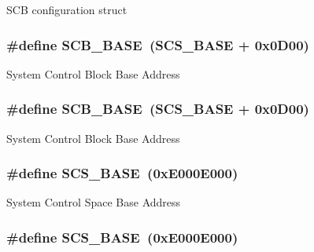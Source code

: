 S\-C\-B configuration struct \hypertarget{group___c_m_s_i_s___c_m3__core__register_gad55a7ddb8d4b2398b0c1cfec76c0d9fd}{
\subsubsection[{S\-C\-B\-\_\-\-B\-A\-S\-E}]{\setlength{\rightskip}{0pt plus 5cm}\#define S\-C\-B\-\_\-\-B\-A\-S\-E~({\bf S\-C\-S\-\_\-\-B\-A\-S\-E} +  0x0\-D00)}}\label{group___c_m_s_i_s___c_m3__core__register_gad55a7ddb8d4b2398b0c1cfec76c0d9fd}
System Control Block Base Address \hypertarget{group___c_m_s_i_s___c_m3__core__register_gad55a7ddb8d4b2398b0c1cfec76c0d9fd}{
\subsubsection[{S\-C\-B\-\_\-\-B\-A\-S\-E}]{\setlength{\rightskip}{0pt plus 5cm}\#define S\-C\-B\-\_\-\-B\-A\-S\-E~({\bf S\-C\-S\-\_\-\-B\-A\-S\-E} +  0x0\-D00)}}\label{group___c_m_s_i_s___c_m3__core__register_gad55a7ddb8d4b2398b0c1cfec76c0d9fd}
System Control Block Base Address \hypertarget{group___c_m_s_i_s___c_m3__core__register_ga3c14ed93192c8d9143322bbf77ebf770}{
\subsubsection[{S\-C\-S\-\_\-\-B\-A\-S\-E}]{\setlength{\rightskip}{0pt plus 5cm}\#define S\-C\-S\-\_\-\-B\-A\-S\-E~(0x\-E000\-E000)}}\label{group___c_m_s_i_s___c_m3__core__register_ga3c14ed93192c8d9143322bbf77ebf770}
System Control Space Base Address \hypertarget{group___c_m_s_i_s___c_m3__core__register_ga3c14ed93192c8d9143322bbf77ebf770}{
\subsubsection[{S\-C\-S\-\_\-\-B\-A\-S\-E}]{\setlength{\rightskip}{0pt plus 5cm}\#define S\-C\-S\-\_\-\-B\-A\-S\-E~(0x\-E000\-E000)}}\label{group___c_m_s_i_s___c_m3__core__register_ga3c14ed93192c8d9143322bbf77ebf770}
